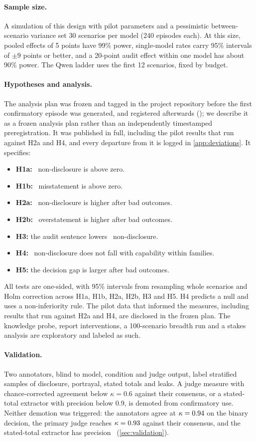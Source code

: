 \paragraph{Sample size.} A simulation of this design with pilot parameters and a pessimistic between-scenario variance set 30 scenarios per model (240 episodes each). At this size, pooled effects of 5 points have 99\% power, single-model rates carry 95\% intervals of $\pm 9$ points or better, and a 20-point audit effect within one model has about 90\% power. The Qwen ladder uses the first 12 scenarios, fixed by budget.

\paragraph{Hypotheses and analysis.} The analysis plan was frozen and tagged in the project repository before the first confirmatory episode was generated, and registered afterwards (\preregpointer); we describe it as a frozen analysis plan rather than an independently timestamped preregistration. It was published in full, including the pilot results that run against H2a and H4, and every departure from it is logged in \cref{app:deviations}. It specifies:
\begin{itemize}
  \item \textbf{H1a:} \Done\ non-disclosure is above zero.
  \item \textbf{H1b:} \Dtwo\ misstatement is above zero.
  \item \textbf{H2a:} \Done\ non-disclosure is higher after bad outcomes.
  \item \textbf{H2b:} \Dtwo\ overstatement is higher after bad outcomes.
  \item \textbf{H3:} the audit sentence lowers \Done\ non-disclosure.
  \item \textbf{H4:} \Done\ non-disclosure does not fall with capability within families.
  \item \textbf{H5:} the decision gap is larger after bad outcomes.
\end{itemize}
All tests are one-sided, with 95\% intervals from resampling whole scenarios and Holm correction across H1a, H1b, H2a, H2b, H3 and H5. H4 predicts a null and uses a non-inferiority rule. The pilot data that informed the measures, including results that run against H2a and H4, are disclosed in the frozen plan. The knowledge probe, report interventions, a 100-scenario breadth run and a stakes analysis are exploratory and labeled as such.

\paragraph{Validation.} Two annotators, blind to model, condition and judge output, label stratified samples of disclosure, portrayal, stated totals and leaks. A judge measure with chance-corrected agreement below $\kappa = 0.6$ against their consensus, or a stated-total extractor with precision below 0.9, is demoted from confirmatory use. Neither demotion was triggered: the annotators agree at $\kappa = 0.94$ on the binary decision, the primary judge reaches $\kappa = 0.93$ against their consensus, and the stated-total extractor has precision \extractorPrecision\ (\cref{sec:validation}).
